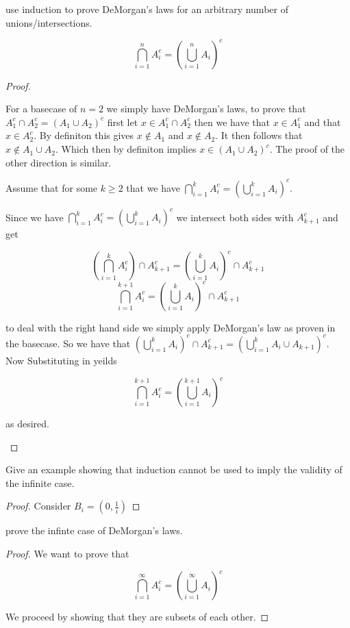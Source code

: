 \documentclass[11pt,largemargins]{homework}
\begin{document}
\begin{alphaparts}
    \questionpart
    use induction to prove DeMorgan's laws for an arbitrary number of unions/intersections. 

    \[\bigcap_{i =1}^n A_i^c = \left(\bigcup_{i = 1}^n A_i \right)^c \]

    \begin{proof}
        \begin{induction}
            \basecase 
            For a basecase of $n = 2$ we simply have DeMorgan's laws, to prove that $A_1^c \cap A_2^c = (A_1 \cup A_2)^c$
            first let $x \in A_1^c \cap A_2^c$ then we have that $x \in A_1^c $ and that $x \in A_2^c$. By definiton this gives 
            $x \notin A_1$ and $x \notin A_2$. It then follows that $x \notin A_1 \cup A_2$. Which then by definiton implies
            $x \in (A_1 \cup A_2)^c $. The proof of the other direction is similar. 
            
            \indhyp
            Assume that for some $k \geq 2$ that we have $\bigcap_{i =1}^k A_i^c = \left(\bigcup_{i = 1}^k A_i \right)^c $.
            
            \indstep
            Since we have  $\bigcap_{i =1}^k A_i^c = \left(\bigcup_{i = 1}^k A_i \right)^c $ we intersect both sides with $A_{k + 1}^c$ and get 

            \[ \left( \bigcap_{i =1}^k A_i^c  \right) \cap A_{k+1}^c = \left(\bigcup_{i = 1}^k A_i \right)^c \cap A_{k+1}^c \] 
            \[\bigcap_{i =1}^{k+1} A_i^c = \left(\bigcup_{i = 1}^k A_i \right)^c \cap A_{k+1}^c \]

            to deal with the right hand side we simply apply DeMorgan's law as proven in the basecase. So we have that $\left(\bigcup_{i = 1}^k A_i \right)^c \cap A_{k+1}^c  = \left( \bigcup_{i = 1}^k A_i \cup A_{k+1} \right)^c$. Now Substituting in yeilds 

            \[\bigcap_{i =1}^{k+1} A_i^c = \left(\bigcup_{i = 1}^{k+1} A_i \right)^c \]

            as desired. 
            
        \end{induction}
    \end{proof}

    \questionpart
    Give an example showing that induction cannot be used to imply the validity of the infinite case.

    \begin{proof}
        Consider $B_i = (0, \frac{1}{i})$
    \end{proof}

    \questionpart
    prove the infinte case of DeMorgan's laws. 

    \begin{proof}
        We want to prove that 

        \[\bigcap_{i = 1}^{\infty} A_i^c = \left(\bigcup_{i = 1}^{\infty} A_i \right)^c \]

        We proceed by showing that they are subsets of each other. 
    \end{proof}
\end{alphaparts}
\end{document}
